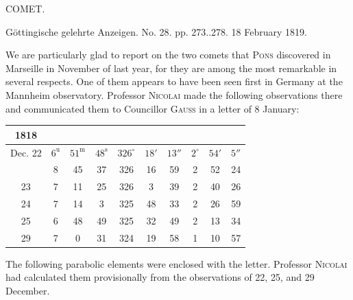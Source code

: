 \clearpage
{}
\begin{center}
\Large COMET.

\medskip
Göttingische gelehrte Anzeigen. No. 28. pp. 273..278. 18 February 1819.
\end{center}

\par\indent We are particularly glad to report on the two comets that \textsc{Pons} discovered in Marseille in November of last year, for they are among the most remarkable in several respects. One of them appears to have been seen first in Germany at the Mannheim observatory. Professor \textsc{Nicolai} made the following observations there and communicated them to Councillor \textsc{Gauss} in a letter of 8 January:

\begin{center}
\setlength{\tabcolsep}{2.2pt}\begin{tabular}{c|ccc|ccc|ccc}
1818 &  &  &  \\
\hline
Dec. 22 & $6^{\mathrm u}$ & $51^{\mathrm m}$ & $48^{\mathrm s}$ & $326^\circ$ & $18'$ & $13''$ & $2^\circ$ & $54'$ & $5''$ \\
        & 8     & 45     & 37     & 326         & 16    & 59     & 2         & 52    & 24    \\
     23 & 7     & 11     & 25     & 326         & 3     & 39     & 2         & 40    & 26    \\
     24 & 7     & 14     & 3      & 325         & 48    & 33     & 2         & 26    & 59    \\
     25 & 6     & 48     & 49     & 325         & 32    & 49     & 2         & 13    & 34    \\
     29 & 7     & 0      & 31     & 324         & 19    & 58     & 1         & 10    & 57    \\
\end{tabular}
\end{center}

\par\indent The following parabolic elements were enclosed with the letter. Professor \textsc{Nicolai} had calculated them provisionally from the observations of 22, 25, and 29 December.

